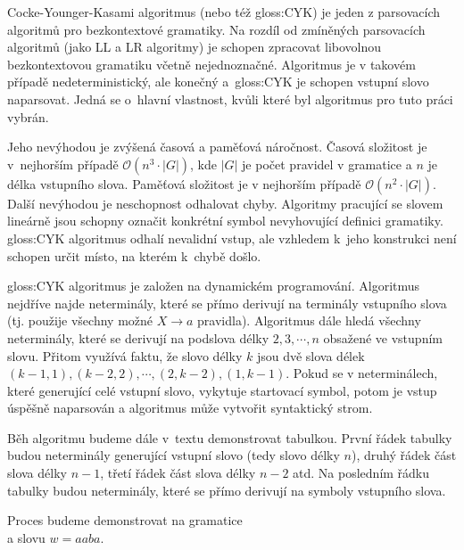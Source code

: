 	Cocke-Younger-Kasami algoritmus \cite{Younger1967} (nebo též \gls{gloss:CYK}) je jeden z parsovacích algoritmů pro bezkontextové gramatiky. Na rozdíl od zmíněných parsovacích algoritmů (jako LL a LR algoritmy) je schopen zpracovat libovolnou bezkontextovou gramatiku včetně nejednoznačné. Algoritmus je v takovém případě nedeterministický, ale konečný a~\gls{gloss:CYK} je schopen vstupní slovo naparsovat. Jedná se o~hlavní vlastnost, kvůli které byl algoritmus pro tuto práci vybrán.
	
	Jeho nevýhodou je zvýšená časová a paměťová náročnost. Časová složitost je v~nejhorším případě $\mathcal{O}(n^3 \cdot |G|)$, kde $|G|$ je počet pravidel v gramatice a $n$ je délka vstupního slova. Paměťová složitost je v nejhorším případě $\mathcal{O}(n^2 \cdot |G|)$. Další nevýhodou je neschopnost odhalovat chyby. Algoritmy pracující se slovem lineárně jsou schopny označit konkrétní symbol nevyhovující definici gramatiky. \gls{gloss:CYK} algoritmus odhalí nevalidní vstup, ale vzhledem k~jeho konstrukci není schopen určit místo, na kterém k~chybě došlo.
	
	\gls{gloss:CYK} algoritmus je založen na dynamickém programování. Algoritmus nej\-dří\-ve najde neterminály, které se přímo derivují na terminály vstupního slova (tj. použije všechny možné $X\rightarrow a$ pravidla). Algoritmus dále hledá všechny neterminály, které se derivují na podslova délky $2,3,\cdots,n$ obsažené ve vstupním slovu. Přitom využívá faktu, že slovo délky $k$ jsou dvě slova délek $(k-1,1),(k-2,2),\cdots,(2,k-2),(1,k-1)$. Pokud se v neterminálech, které generující celé vstupní slovo, vykytuje startovací symbol, potom je vstup úspěšně naparsován a algoritmus může vytvořit syntaktický strom.
	
	Běh algoritmu budeme dále v~textu demonstrovat tabulkou. První řádek tabulky budou neterminály generující vstupní slovo (tedy slovo délky $n$), druhý řádek část slova délky $n-1$, třetí řádek část slova délky $n-2$ atd. Na posledním řádku tabulky budou neterminály, které se přímo derivují na symboly vstupního slova.
	
	Proces budeme demonstrovat na gramatice  \\ a slovu $w=aaba$.
	
